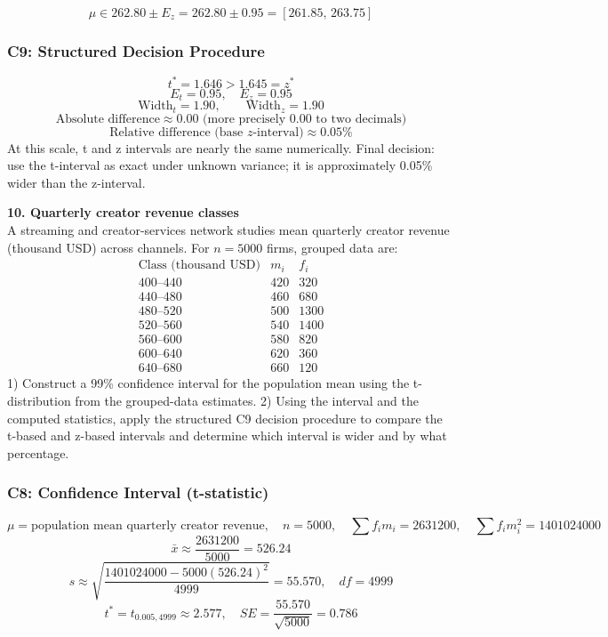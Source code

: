 \begin{ExamProblems}
		\[
		\mu\in 262.80\pm E_z=262.80\pm 0.95=[261.85,\,263.75]
		\]

		\subsubsection*{C9: Structured Decision Procedure}
		\[
		t^*=1.646>1.645=z^*
		\]
		\[
		E_t=0.95,\quad E_z=0.95
		\]
		\[
		\text{Width}_t=1.90,\qquad \text{Width}_z=1.90
		\]
		\[
		\text{Absolute difference}\approx 0.00\text{ (more precisely }0.00\text{ to two decimals)}
		\]
		\[
		\text{Relative difference (base }z\text{-interval)}\approx 0.05\%
		\]
		At this scale, t and z intervals are nearly the same numerically.
		Final decision: use the t-interval as exact under unknown variance; it is approximately 0.05\% wider than the z-interval.

		\newpage
		\item
		\textbf{10. Quarterly creator revenue classes}\\
		A streaming and creator-services network studies mean quarterly creator revenue (thousand USD) across channels.
		For $n=5000$ firms, grouped data are:
		\[
		\begin{array}{c|c|c}
		\text{Class (thousand USD)} & m_i & f_i\\\hline
		400\text{--}440 & 420 & 320\\
		440\text{--}480 & 460 & 680\\
		480\text{--}520 & 500 & 1300\\
		520\text{--}560 & 540 & 1400\\
		560\text{--}600 & 580 & 820\\
		600\text{--}640 & 620 & 360\\
		640\text{--}680 & 660 & 120
		\end{array}
		\]
		1) Construct a 99\% confidence interval for the population mean using the t-distribution from the grouped-data estimates.
		2) Using the interval and the computed statistics, apply the structured C9 decision procedure to compare the t-based and z-based intervals and determine which interval is wider and by what percentage.

		\subsubsection*{C8: Confidence Interval (t-statistic)}
		\[
		\mu=\text{population mean quarterly creator revenue},\quad n=5000,\quad \sum f_im_i=2631200,\quad \sum f_im_i^2=1401024000
		\]
		\[
		\bar{x}\approx\frac{2631200}{5000}=526.24
		\]
		\[
		s\approx\sqrt{\frac{1401024000-5000(526.24)^2}{4999}}=55.570,\quad df=4999
		\]
		\[
		t^*=t_{0.005,4999}\approx 2.577,\quad SE=\frac{55.570}{\sqrt{5000}}=0.786
		\]


\end{ExamProblems}
